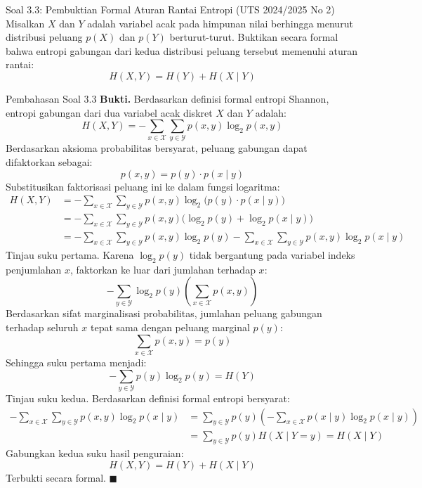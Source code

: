 \documentclass[11pt,a4paper]{article}
\newenvironment{proof}{\noindent\textbf{Bukti.}}{\hfill$\blacksquare$\vspace{0.3em}}
\begin{document}
\vspace{0.4cm}

\begin{soalbox}{Soal 3.3: Pembuktian Formal Aturan Rantai Entropi (UTS 2024/2025 No 2)}
Misalkan $X$ dan $Y$ adalah variabel acak pada himpunan nilai berhingga menurut distribusi peluang $p(X)$ dan $p(Y)$ berturut-turut.
Buktikan secara formal bahwa entropi gabungan dari kedua distribusi peluang tersebut memenuhi aturan rantai:
\[
H(X, Y) = H(Y) + H(X \mid Y)
\]
\end{soalbox}

\begin{solusibox}{Pembahasan Soal 3.3}
\begin{proof}
Berdasarkan definisi formal entropi Shannon, entropi gabungan dari dua variabel acak diskret $X$ dan $Y$ adalah:
\[
H(X, Y) = -\sum_{x \in \mathcal{X}} \sum_{y \in \mathcal{Y}} p(x, y) \log_2 p(x, y)
\]
Berdasarkan aksioma probabilitas bersyarat, peluang gabungan dapat difaktorkan sebagai:
\[
p(x, y) = p(y) \cdot p(x \mid y)
\]
Substitusikan faktorisasi peluang ini ke dalam fungsi logaritma:
\begin{align*}
H(X, Y) &= -\sum_{x \in \mathcal{X}} \sum_{y \in \mathcal{Y}} p(x, y) \log_2 \big(p(y) \cdot p(x \mid y)\big) \\
&= -\sum_{x \in \mathcal{X}} \sum_{y \in \mathcal{Y}} p(x, y) \big(\log_2 p(y) + \log_2 p(x \mid y)\big) \\
&= -\sum_{x \in \mathcal{X}} \sum_{y \in \mathcal{Y}} p(x, y) \log_2 p(y) - \sum_{x \in \mathcal{X}} \sum_{y \in \mathcal{Y}} p(x, y) \log_2 p(x \mid y)
\end{align*}
Tinjau suku pertama. Karena $\log_2 p(y)$ tidak bergantung pada variabel indeks penjumlahan $x$, faktorkan ke luar dari jumlahan terhadap $x$:
\[
-\sum_{y \in \mathcal{Y}} \log_2 p(y) \left(\sum_{x \in \mathcal{X}} p(x, y)\right)
\]
Berdasarkan sifat marginalisasi probabilitas, jumlahan peluang gabungan terhadap seluruh $x$ tepat sama dengan peluang marginal $p(y)$:
\[
\sum_{x \in \mathcal{X}} p(x, y) = p(y)
\]
Sehingga suku pertama menjadi:
\[
-\sum_{y \in \mathcal{Y}} p(y) \log_2 p(y) = H(Y)
\]
Tinjau suku kedua. Berdasarkan definisi formal entropi bersyarat:
\begin{align*}
-\sum_{x \in \mathcal{X}} \sum_{y \in \mathcal{Y}} p(x, y) \log_2 p(x \mid y) 
&= \sum_{y \in \mathcal{Y}} p(y) \left(-\sum_{x \in \mathcal{X}} p(x \mid y) \log_2 p(x \mid y)\right) \\
&= \sum_{y \in \mathcal{Y}} p(y) H(X \mid Y = y) = H(X \mid Y)
\end{align*}
Gabungkan kedua suku hasil penguraian:
\[
H(X, Y) = H(Y) + H(X \mid Y)
\]
Terbukti secara formal.
\end{proof}
\end{solusibox}
\end{document}
